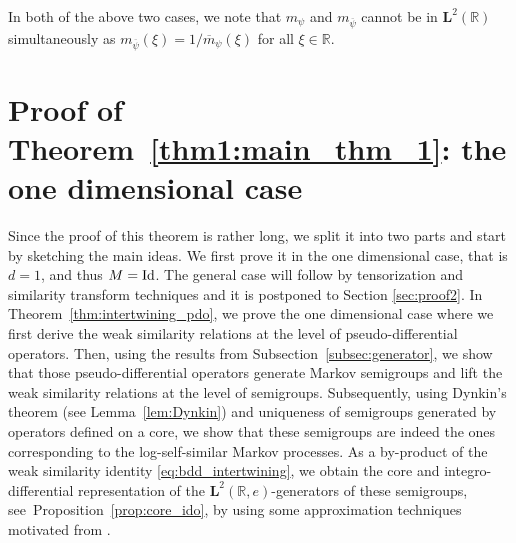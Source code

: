 \documentclass[12pt]{amsart}
\newcommand{\hlabel}{\phantomsection\label}
\numberwithin{equation}{section}
\newcommand{\bb}{\mathbb}
\newcommand{\ov}{\overline}
\newcommand{\bmrm}[2][2]{\mathbf{#2}^{#1}}
\newcommand{\LRe}{\bmrm{L}(\bb{R},e)}
\theoremstyle{definition}
\theoremstyle{assump}
\theoremstyle{remark}
\begin{document}
{In both of the above two cases, we note that $m_{\psi}$ and $m_{\ov\psi}$ cannot be in $\bmrm{L}(\bb R)$ simultaneously as $m_{\ov\psi}(\xi)=1/\ov{m}_{\psi}(\xi)$ for all $\xi\in\bb R$.

\section{Proof of Theorem~\ref{thm1:main_thm_1}: the one dimensional case} \hlabel{sec:proof} Since the proof of this theorem  is rather long, we split it into two parts  and  start by sketching the main ideas. We first prove it in the one dimensional case, that is $d=1$, and thus $M=\rm{Id}$. The general case  will follow by tensorization and  similarity transform techniques and it is postponed to Section \ref{sec:proof2}. In Theorem~\ref{thm:intertwining_pdo}, we prove the one dimensional case where we first derive the weak similarity relations at the level of pseudo-differential operators. Then, using the results from Subsection~\ref{subsec:generator}, we show that those pseudo-differential operators generate Markov semigroups and lift the weak similarity relations  at the level of semigroups. Subsequently, using Dynkin's theorem (see Lemma~\ref{lem:Dynkin}) and uniqueness of semigroups generated by operators defined on a core, we show that these semigroups are indeed the ones corresponding to the log-self-similar Markov processes. As a by-product of the weak similarity identity \eqref{eq:bdd_intertwining}, we obtain the core and integro-differential representation of the $\LRe$-generators of these semigroups, see~Proposition~\ref{prop:core_ido}, by using some approximation techniques motivated from \cite{patie2018}.

}
\end{document}
